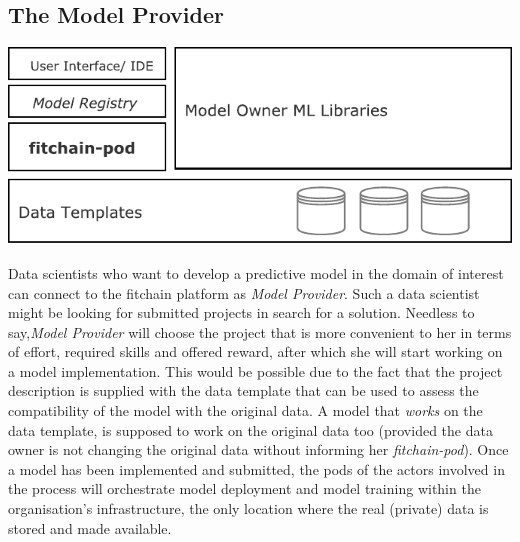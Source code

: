 \documentclass[12pt, a4paper,titlepage]{extreport}
\begin{document}
\subsection{The Model Provider}

\begin{center}
\includegraphics[scale=1]{pod_modelowner.pdf} 
\end{center}

Data scientists who want to develop a predictive model in the domain of interest can connect to the fitchain platform as \emph{Model Provider}. Such a data scientist might be looking for submitted projects in search for a solution. Needless to say,\emph{Model Provider} will choose the project that is more convenient to her in terms of effort, required skills and offered reward, after which she will start working on a model implementation. This would be possible due to the fact that the project description is supplied with the data template that can be used to assess the compatibility of the model with the original data. A model that \textit{works} on the data template, is supposed to work on the original data too (provided the data owner is not changing the original data without informing her \textit{fitchain-pod}).
Once a model has been implemented and submitted, the pods of the actors involved in the process will orchestrate model deployment and model training within the organisation's infrastructure, the only location where the real (private) data is stored and made available. %
 
\end{document}
